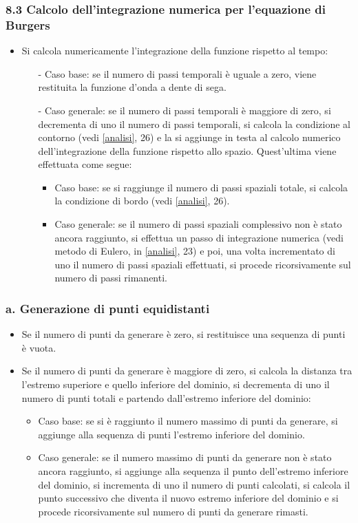 \subsubsection*{8.3 Calcolo dell'integrazione numerica per l'equazione di Burgers}
\begin{itemize}
\item Si calcola numericamente l'integrazione della funzione rispetto al tempo:
\begin{itemize}
\item[-] Caso base: se il numero di passi temporali è uguale a zero, viene restituita la funzione d'onda a dente di sega.
\item[-] Caso generale: se il numero di passi temporali è maggiore di zero, si decrementa di uno il numero di passi temporali, si calcola la condizione al contorno (vedi \ref{analisi}, 26) e la si aggiunge in testa al calcolo numerico dell'integrazione della funzione rispetto allo spazio. Quest'ultima viene effettuata come segue:
\begin{itemize}
\item Caso base: se si raggiunge il numero di passi spaziali totale, si calcola la condizione di bordo (vedi \ref{analisi}, 26).
\item Caso generale: se il numero di passi spaziali complessivo non è stato ancora raggiunto, si effettua un passo di integrazione numerica (vedi metodo di Eulero, in \ref{analisi}, 23) e poi, una volta incrementato di uno il numero di passi spaziali effettuati, si procede ricorsivamente sul numero di passi rimanenti. 
\end{itemize}
\end{itemize}
\end{itemize}


\subsubsection*{a. Generazione di punti equidistanti}
\begin{itemize}
\item Se il numero di punti da generare è zero, si restituisce una sequenza di punti è vuota.
\item Se il numero di punti da generare è maggiore di zero, si calcola la distanza tra l'estremo superiore e quello inferiore del dominio, si decrementa di uno il numero di punti totali e partendo dall'estremo inferiore del dominio:
\begin{itemize}
\item Caso base: se si è raggiunto il numero massimo di punti da generare, si aggiunge alla sequenza di punti l'estremo inferiore del dominio.
\item Caso generale: se il numero massimo di punti da generare non è stato ancora raggiunto, si aggiunge alla sequenza il punto dell'estremo inferiore del dominio, si incrementa di uno il numero di punti calcolati, si calcola il punto successivo che diventa il nuovo estremo inferiore del dominio e si procede ricorsivamente sul numero di punti da generare rimasti.
\end{itemize}
\end{itemize}

